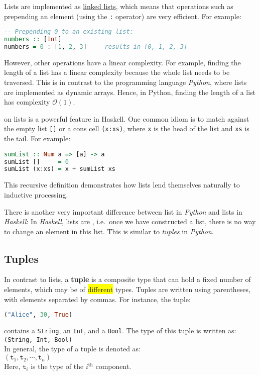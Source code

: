 Lists are implemented as \href{https://en.wikipedia.org/wiki/Linked_list}{linked lists}, which means that
operations such as prepending an element (using the \texttt{:} operator) are very efficient. For example: 
\begin{lstlisting}[style=haskellstyle, language=Haskell]
-- Prepending 0 to an existing list:
numbers :: [Int]
numbers = 0 : [1, 2, 3]  -- results in [0, 1, 2, 3]
\end{lstlisting}
However, other operations have a linear complexity.  For example, finding the length of a list has a linear
complexity because the whole list needs to be traversed.  This is in contrast to the programming language
\textsl{Python}, where lists are implemented as dynamic arrays.  Hence, in Python, finding the length of a list
has complexity $\mathcal{O}(1)$.

 on lists is a powerful feature in Haskell. One common idiom is to match against the
empty list \texttt{[]} or a cons cell \texttt{(x:xs)}, where \texttt{x} is the head of the list and \texttt{xs}
is the tail. For example: 
\begin{lstlisting}[style=haskellstyle, language=Haskell]
sumList :: Num a => [a] -> a
sumList []     = 0
sumList (x:xs) = x + sumList xs
\end{lstlisting}
This recursive definition demonstrates how lists lend themselves naturally to inductive processing.

There is another very important difference between list in \textsl{Python} and lists in \textsl{Haskell}: In
\textsl{Haskell}, lists are , i.e.~once we have constructed a list, there is no way to change
an element in this list.  This is similar to \textsl{tuples} in \textsl{Python}.

\subsection{Tuples}
In contrast to lists, a \textbf{tuple} is a composite type that can hold a fixed number of elements, which may
be of \colorbox{yellow}{different} types. Tuples are written using parentheses, with elements separated by commas. For instance, the tuple:
\begin{lstlisting}[style=haskellstyle, language=Haskell]
("Alice", 30, True)
\end{lstlisting}
contains a \texttt{String}, an \texttt{Int}, and a \texttt{Bool}. The type of this tuple is written as:\\[0.2cm]
\hspace*{1.3cm}
\texttt{(String, Int, Bool)}
\\[0.2cm]
In general, the type of a tuple is denoted as:
\\[0.2cm]
\hspace*{1.3cm}
$(\texttt{t}_1, \texttt{t}_2, \cdots, \texttt{t}_n)$
\\[0.2cm]
Here, $\texttt{t}_i$ is the type of the $i^{\textrm{th}}$ component.

